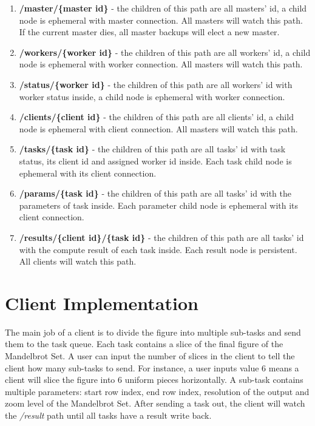 \documentclass[runningheads,a4paper]{llncs}
\begin{document}
\begin{enumerate}
\item \textbf{/master/\{master id\}} - the children of this path are all masters' id, a child node is ephemeral with master connection. All masters will watch this path. If the current master dies, all master backups will elect a new master.
\item \textbf{/workers/\{worker id\}} -  the children of this path are all workers' id, a child node is ephemeral with worker connection. All masters will watch this path.
\item \textbf{/status/\{worker id\}} - the children of this path are all workers' id with worker status inside, a child node is ephemeral with worker connection.
\item \textbf{/clients/\{client id\}} -  the children of this path are all clients' id, a child node is ephemeral with client connection. All masters will watch this path.
\item \textbf{/tasks/\{task id\}} - the children of this path are all tasks' id with task status, its client id and assigned worker id inside. Each task child node is ephemeral with its client connection.
\item \textbf{/params/\{task id\}} - the children of this path are all tasks' id with the parameters of task inside. Each parameter child node is ephemeral with its client connection.
\item \textbf{/results/\{client id\}/\{task id\}} -  the children of this path are all tasks' id with the compute result of each task inside. Each result node is persistent. All clients will watch this path.
\end{enumerate}

\section{Client Implementation}

The main job of a client is to divide the figure into multiple sub-tasks and send them to the task queue. Each task contains a slice of the final figure of the Mandelbrot Set. A user can input the number of slices in the client to tell the client how many sub-tasks to send. For instance, a user inputs value 6 means a client will slice the figure into 6 uniform pieces horizontally. A sub-task contains multiple parameters: start row index, end row index, resolution of the output and zoom level of the Mandelbrot Set. After sending a task out, the client will watch the \emph{/result} path until all tasks have a result write back.
\end{document}
